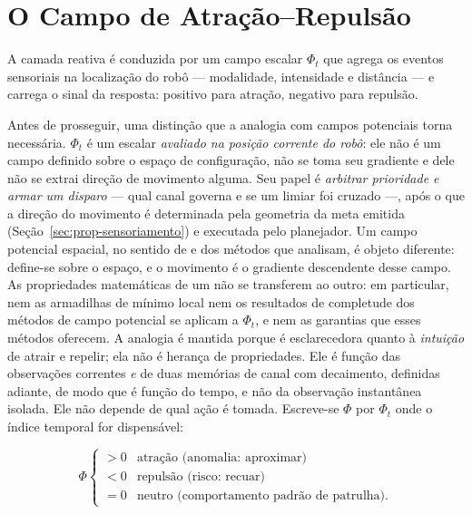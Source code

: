 \section{O Campo de Atração--Repulsão}
\label{sec:prop-campo}

A camada reativa é conduzida por um campo escalar $\Phi_t$ que agrega os eventos
sensoriais na localização do robô --- modalidade, intensidade e distância --- e
carrega o sinal da resposta: positivo para atração, negativo para repulsão.

Antes de prosseguir, uma distinção que a analogia com campos potenciais torna
necessária. $\Phi_t$ é um escalar \emph{avaliado na posição corrente do robô}: ele não
é um campo definido sobre o espaço de configuração, não se toma seu gradiente e dele
não se extrai direção de movimento alguma. Seu papel é \emph{arbitrar prioridade e
armar um disparo} --- qual canal governa e se um limiar foi cruzado ---, após o que a
direção do movimento é determinada pela geometria da meta emitida
(Seção~\ref{sec:prop-sensoriamento}) e executada pelo planejador. Um campo potencial
espacial, no sentido de  e dos métodos que
 analisam, é objeto diferente: define-se sobre o espaço, e o
movimento é o gradiente descendente desse campo. As propriedades matemáticas de um não
se transferem ao outro: em particular, nem as armadilhas de mínimo local nem os
resultados de completude dos métodos de campo potencial se aplicam a $\Phi_t$, e nem
as garantias que esses métodos oferecem. A analogia é mantida porque é esclarecedora
quanto à \emph{intuição} de atrair e repelir; ela não é herança de propriedades. Ele é
função das observações correntes \emph{e} de duas memórias de canal com decaimento,
definidas adiante, de modo que é função do tempo, e não da observação instantânea
isolada. Ele não depende de qual ação é tomada. Escreve-se $\Phi$ por $\Phi_t$ onde o
índice temporal for dispensável:

\begin{equation}
\label{eq:prop-phi}
\Phi
\begin{cases}
> 0 & \text{atração (anomalia: aproximar)}\\
< 0 & \text{repulsão (risco: recuar)}\\
= 0 & \text{neutro (comportamento padrão de patrulha).}
\end{cases}
\end{equation}

